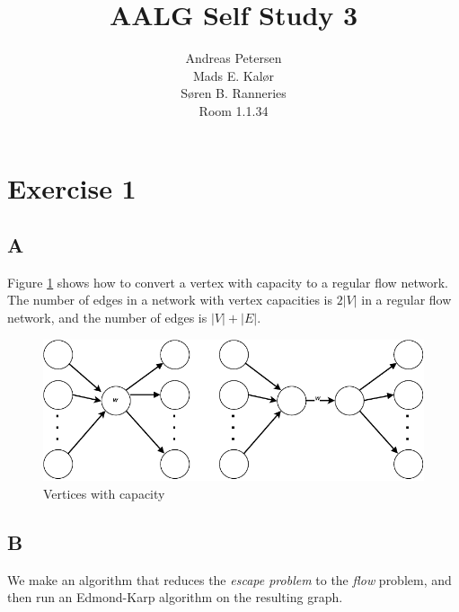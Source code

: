 \documentclass[koma,a4paper]{article}
\title{AALG Self Study 3}
\author{Andreas Petersen\\
Mads E. Kalør\\
Søren B. Ranneries\\
Room 1.1.34}
\begin{document}
\maketitle

\pagebreak

\section{Exercise 1}

\subsection{A}
Figure \ref{fig:vertices_capacity} shows how to convert a vertex with capacity to a regular flow network. The number of edges in a network with vertex capacities is $2|V|$ in a regular flow network, and the number of edges is $|V|+|E|$.

\begin{figure}
  \includegraphics{weighted_vertices}
  \caption{Vertices with capacity}
  \label{fig:vertices_capacity}
\end{figure}

\subsection{B}
We make an algorithm that reduces the \emph{escape problem}  to the \emph{flow} problem, and then run an Edmond-Karp algorithm on the resulting graph.
\end{document}
